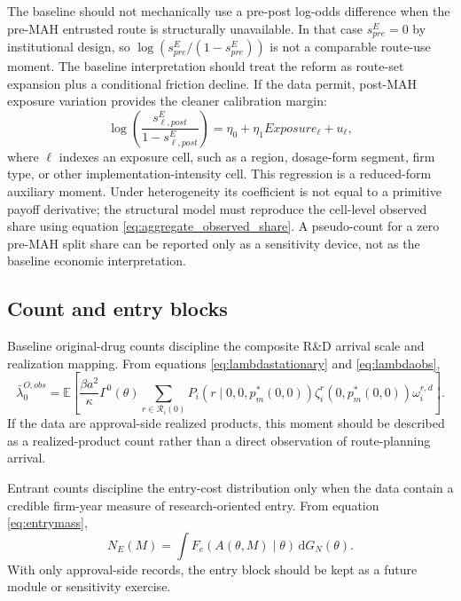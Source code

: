 \documentclass[12pt]{article}
\newcommand{\E}{\mathbb{E}}
\newcommand{\1}{\mathbf{1}}
\newcommand{\dd}{\mathrm{d}}
\newcommand{\calR}{\mathcal{R}}
\begin{document}
The baseline should not mechanically use a pre-post log-odds difference when the pre-MAH entrusted route is structurally unavailable. In that case $s_{pre}^E=0$ by institutional design, so $\log(s_{pre}^E/(1-s_{pre}^E))$ is not a comparable route-use moment. The baseline interpretation should treat the reform as route-set expansion plus a conditional friction decline. If the data permit, post-MAH exposure variation provides the cleaner calibration margin:
\begin{equation}
    \log\left(\frac{s_{\ell,post}^E}{1-s_{\ell,post}^E}\right)
    =
    \eta_0+\eta_1 Exposure_\ell+u_\ell,
    \label{eq:post_exposure_logodds}
\end{equation}
where $\ell$ indexes an exposure cell, such as a region, dosage-form segment, firm type, or other implementation-intensity cell. This regression is a reduced-form auxiliary moment. Under heterogeneity its coefficient is not equal to a primitive payoff derivative; the structural model must reproduce the cell-level observed share using equation \eqref{eq:aggregate_observed_share}. A pseudo-count for a zero pre-MAH split share can be reported only as a sensitivity device, not as the baseline economic interpretation.

\subsection{Count and entry blocks}

Baseline original-drug counts discipline the composite R\&D arrival scale and realization mapping. From equations \eqref{eq:lambdastationary} and \eqref{eq:lambdaobs},
\begin{equation}
    \bar\lambda_0^{O,obs}
    =
    \E\left[
    \frac{\beta a^2}{\kappa}\Gamma^0(\theta)
    \sum_{r\in\calR_i(0)}
    P_i(r\mid0,0,p_m^*(0,0))\zeta_i^r(0,p_m^*(0,0))\omega_i^{r,d}
    \right].
    \label{eq:arrival_scale}
\end{equation}
If the data are approval-side realized products, this moment should be described as a realized-product count rather than a direct observation of route-planning arrival.

Entrant counts discipline the entry-cost distribution only when the data contain a credible firm-year measure of research-oriented entry. From equation \eqref{eq:entrymass},
\begin{equation}
    N_E(M)=
    \int
    F_e\!\left(A(\theta,M)\mid\theta\right)
    \,\dd G_N(\theta).
    \label{eq:entry_calib}
\end{equation}
With only approval-side records, the entry block should be kept as a future module or sensitivity exercise.
\end{document}
